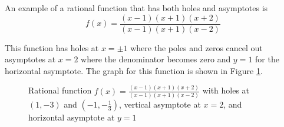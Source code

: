 \begin{example} An example of a rational function that has both holes and asymptotes is
    $$
    f(x) = \frac{(x-1)(x+1)(x+2)}{(x-1)(x+1)(x-2)}
    $$

    \noindent This function has holes at $x = \pm 1$ where the poles and zeros cancel out asymptotes at $x = 2$ where the denominator becomes zero and $y = 1$ for the horizontal asymptote. The graph for this function is shown in Figure \ref{fig:rationalholeandasymptote}.

    \begin{figure}[!ht]
        \centering
                \caption{Rational function $f(x) = \frac{(x-1)(x+1)(x+2)}{(x-1)(x+1)(x-2)}$ with holes at $(1,-3)$ and $(-1,-\frac{1}{3})$, vertical asymptote at $x=2$, and horizontal asymptote at $y=1$}
                \label{fig:rationalholeandasymptote}
            \end{figure}
        \end{example}

